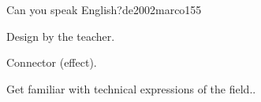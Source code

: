 \begin{syllabus}
\begin{unit}{Can you speak English?}{}{de2002marco}{15}{5}
   \begin{topics}
      \item Design by the teacher.
      \item Connector (effect).
   \end{topics}

   \begin{learningoutcomes}
      \item Get familiar with technical expressions of the field..
   \end{learningoutcomes}
\end{unit}

\begin{coursebibliography}
\end{coursebibliography}

\end{syllabus}
